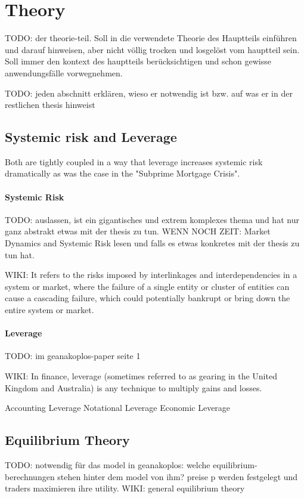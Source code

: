 \documentclass[../Bachelorarbeit.tex]{subfiles}
\begin{document}
\chapter{Theory}
\label{ch:theory}

TODO: der theorie-teil. Soll in die verwendete Theorie des Hauptteils einführen und darauf hinweisen, aber nicht völlig trocken und losgelöst vom hauptteil sein. Soll immer den kontext des hauptteils berücksichtigen und schon gewisse anwendungsfälle vorwegnehmen.

TODO: jeden abschnitt erklären, wieso er notwendig ist bzw. auf was er in der restlichen thesis hinweist 

\section{Systemic risk and Leverage}
Both are tightly coupled in a way that leverage increases systemic risk dramatically as was the case in the "Subprime Mortgage Crisis".

\subsubsection{Systemic Risk}
TODO: auslassen, ist ein gigantisches und extrem komplexes thema und hat nur ganz abstrakt etwas mit der thesis zu tun. WENN NOCH ZEIT: Market Dynamics and Systemic Risk lesen und falls es etwas konkretes mit der thesis zu tun hat.

WIKI: It refers to the risks imposed by interlinkages and interdependencies in a system or market, where the failure of a single entity or cluster of entities can cause a cascading failure, which could potentially bankrupt or bring down the entire system or market.

\cite{Milan2010}

\subsubsection{Leverage}
TODO: im geanakoplos-paper seite 1

WIKI: In finance, leverage (sometimes referred to as gearing in the United Kingdom and Australia) is any technique to multiply gains and losses.

Accounting Leverage
Notational Leverage
Economic Leverage

\section{Equilibrium Theory}	
TODO: notwendig für das model in geanakoplos: welche equilibrium-berechnungen stehen hinter dem model von ihm?
preise p werden festgelegt und traders maximieren ihre utility.
WIKI: general equilibrium theory
\end{document}
